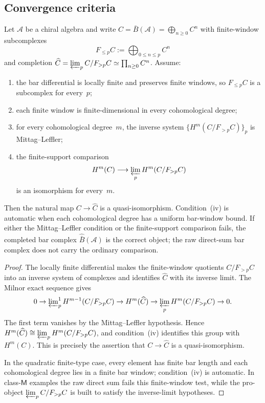 \subsection{Convergence criteria}

\begin{theorem}\label{thm:bar-convergence}
Let $\mathcal{A}$ be a chiral algebra and write
$C=\bar{B}(\mathcal{A})=\bigoplus_{n\ge0}C^n$ with finite-window
subcomplexes
\[
F_{\le p}C:=\bigoplus_{0\le n\le p}C^n
\]
and completion
$\widehat C=\varprojlim_p C/F_{>p}C\simeq\prod_{n\ge0}C^n$.
Assume:
\begin{enumerate}[label=\textup{(\roman*)}]
\item the bar differential is locally finite and preserves finite
 windows, so $F_{\le p}C$ is a subcomplex for every~$p$;
\item each finite window is finite-dimensional in every cohomological
 degree;
\item for every cohomological degree~$m$, the inverse system
 $\{H^m(C/F_{>p}C)\}_p$ is Mittag--Leffler;
\item the finite-support comparison
 \[
 H^m(C)\longrightarrow \varprojlim_p H^m(C/F_{>p}C)
 \]
 is an isomorphism for every~$m$.
\end{enumerate}
Then the natural map $C\to\widehat C$ is a quasi-isomorphism.
Condition~\textup{(iv)} is automatic when each cohomological degree has
a uniform bar-window bound. If either the Mittag--Leffler condition or
the finite-support comparison fails, the completed bar complex
$\widehat{\bar B}(\mathcal A)$ is the correct object; the raw
direct-sum bar complex does not carry the ordinary comparison.
\end{theorem}

\begin{proof}
The locally finite differential makes the finite-window quotients
$C/F_{>p}C$ into an inverse system of complexes and identifies
$\widehat C$ with its inverse limit. The Milnor exact sequence gives
\[
0\to\varprojlim\nolimits^1_p H^{m-1}(C/F_{>p}C)
\to H^m(\widehat C)
\to\varprojlim_p H^m(C/F_{>p}C)\to0.
\]
The first term vanishes by the Mittag--Leffler hypothesis. Hence
$H^m(\widehat C)\cong\varprojlim_p H^m(C/F_{>p}C)$, and condition~(iv)
identifies this group with $H^m(C)$. This is precisely the assertion
that $C\to\widehat C$ is a quasi-isomorphism.

In the quadratic finite-type case, every element has finite bar length
and each cohomological degree lies in a finite bar window; condition~(iv)
is automatic. In class-$\mathsf M$ examples the raw direct sum fails
this finite-window test, while the pro-object
$\varprojlim_p C/F_{>p}C$ is built to satisfy the inverse-limit
hypotheses.
\end{proof}

